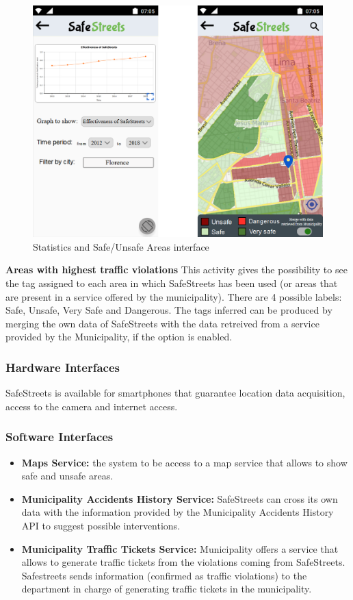        \begin{figure}[h]
        \centering
        \includegraphics[scale=0.56]{Images/statistics_safe_unsafe2.png}
        \caption{Statistics and Safe/Unsafe Areas interface}
    \end{figure}\vspace{10mm}
    \newline\textbf{Areas with highest traffic violations}\newline
    This activity gives the possibility to see the tag assigned to each area in which SafeStreets has been used (or areas that are present in a service offered by the municipality). There are 4 possible labels: Safe, Unsafe, Very Safe and Dangerous. The tags inferred can be produced by merging the own data of SafeStreets with the data retreived from a service provided by the Municipality, if the option is enabled.
\subsubsection{Hardware Interfaces}
SafeStreets is available for smartphones that guarantee location data acquisition, access to the camera and internet access.
    \newpage
\subsubsection{Software Interfaces}
\begin{itemize}
    \item \textbf{Maps Service:} the system to be access to a map service that allows to show safe and unsafe areas.
    \item \textbf{Municipality Accidents History Service:} SafeStreets can cross its own data with the information provided by the Municipality Accidents History API to suggest possible interventions.
    \item \textbf{Municipality Traffic Tickets Service:} Municipality offers a service that allows to generate traffic tickets from the violations coming from SafeStreets. Safestreets sends information (confirmed as traffic violations) to the department in charge of generating traffic tickets in the municipality.
\end{itemize}

